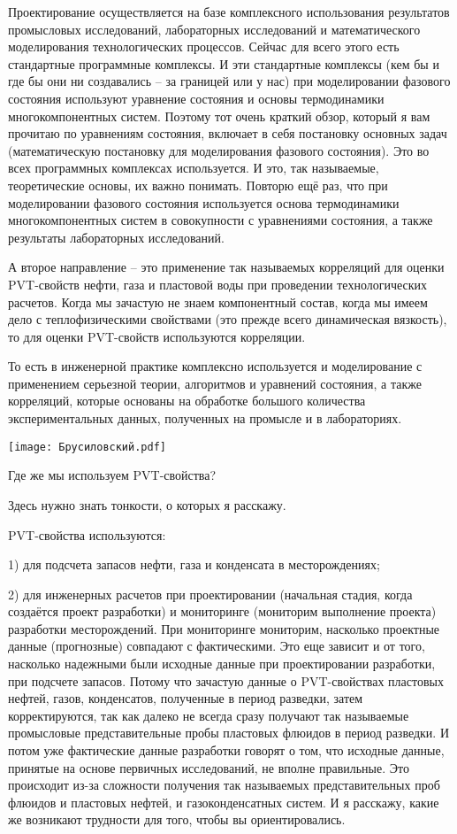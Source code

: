 \documentclass[main.tex]{subfiles}
\begin{document}
Проектирование осуществляется на базе комплексного использования результатов промысловых исследований, лабораторных исследований и математического моделирования технологических процессов.
Сейчас для всего этого есть стандартные программные комплексы.
И эти стандартные комплексы (кем бы и где бы они ни создавались -- за границей или у нас) при моделировании фазового состояния используют уравнение состояния и основы термодинамики многокомпонентных систем.
Поэтому тот очень краткий обзор, который я вам прочитаю по уравнениям состояния, включает в себя постановку основных задач (математическую постановку для моделирования фазового состояния).
Это во всех программных комплексах используется.
И это, так называемые, теоретические основы, их важно понимать.
Повторю ещё раз, что при моделировании фазового состояния используется основа термодинамики многокомпонентных систем в совокупности с уравнениями состояния, а также результаты лабораторных исследований.

А второе направление -- это применение так называемых корреляций для оценки PVT-свойств нефти, газа и пластовой воды при проведении технологических расчетов.
Когда мы зачастую не знаем компонентный состав, когда мы имеем дело с теплофизическими свойствами (это прежде всего динамическая вязкость), то для оценки PVT-свойств используются корреляции.

То есть в инженерной практике комплексно используется и моделирование с применением серьезной теории, алгоритмов и уравнений состояния, а также корреляций, которые основаны на обработке большого количества экспериментальных данных, полученных на промысле и в лабораториях.

\begin{center}
\texttt{[image: Брусиловский.pdf]}
\end{center}

Где же мы используем PVT-свойства?

Здесь нужно знать тонкости, о которых я расскажу.

PVT-свойства используются:

1) для подсчета запасов нефти, газа и конденсата в месторождениях;

2) для инженерных расчетов при проектировании (начальная стадия, когда создаётся проект разработки) и мониторинге (мониторим выполнение проекта) разработки месторождений.
При мониторинге мониторим, насколько проектные данные (прогнозные) совпадают с фактическими.
Это еще зависит и от того, насколько надежными были исходные данные при проектировании разработки, при подсчете запасов.
Потому что зачастую данные о PVT-свойствах пластовых нефтей, газов, конденсатов, полученные в период разведки, затем корректируются, так как далеко не всегда сразу получают так называемые промысловые представительные пробы пластовых флюидов в период разведки.
И потом уже фактические данные разработки говорят о том, что исходные данные, принятые на основе первичных исследований, не вполне правильные.
Это происходит из-за сложности получения так называемых представительных проб флюидов и пластовых нефтей, и газоконденсатных систем.
И я расскажу, какие же возникают трудности для того, чтобы вы ориентировались. 
\end{document}
